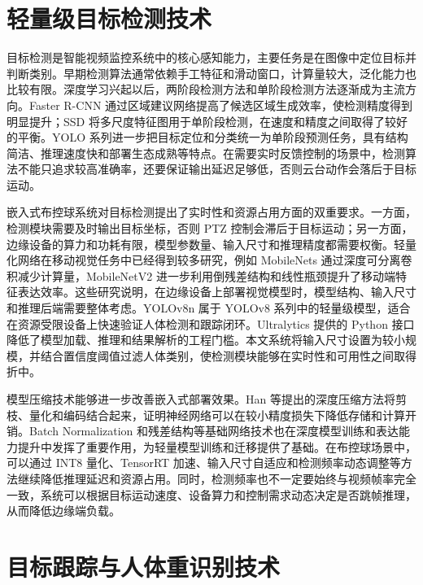 \section{轻量级目标检测技术}

目标检测是智能视频监控系统中的核心感知能力，主要任务是在图像中定位目标并判断类别。早期检测算法通常依赖手工特征和滑动窗口，计算量较大，泛化能力也比较有限。深度学习兴起以后，两阶段检测方法和单阶段检测方法逐渐成为主流方向。Faster R-CNN 通过区域建议网络提高了候选区域生成效率，使检测精度得到明显提升\cite{ren_faster_rcnn_2015}；SSD 将多尺度特征图用于单阶段检测，在速度和精度之间取得了较好的平衡\cite{liu_ssd_2016}。YOLO 系列进一步把目标定位和分类统一为单阶段预测任务，具有结构简洁、推理速度快和部署生态成熟等特点\cite{redmon_yolo_2016,redmon_yolov3_2018}。在需要实时反馈控制的场景中，检测算法不能只追求较高准确率，还要保证输出延迟足够低，否则云台动作会落后于目标运动。

嵌入式布控球系统对目标检测提出了实时性和资源占用方面的双重要求。一方面，检测模块需要及时输出目标坐标，否则 PTZ 控制会滞后于目标运动；另一方面，边缘设备的算力和功耗有限，模型参数量、输入尺寸和推理精度都需要权衡。轻量化网络在移动视觉任务中已经得到较多研究，例如 MobileNets 通过深度可分离卷积减少计算量\cite{howard_mobilenets_2017}，MobileNetV2 进一步利用倒残差结构和线性瓶颈提升了移动端特征表达效率\cite{sandler_mobilenetv2_2018}。这些研究说明，在边缘设备上部署视觉模型时，模型结构、输入尺寸和推理后端需要整体考虑。YOLOv8n 属于 YOLOv8 系列中的轻量级模型，适合在资源受限设备上快速验证人体检测和跟踪闭环。Ultralytics 提供的 Python 接口降低了模型加载、推理和结果解析的工程门槛\cite{ultralytics_yolov8}。本文系统将输入尺寸设置为较小规模，并结合置信度阈值过滤人体类别，使检测模块能够在实时性和可用性之间取得折中。

模型压缩技术能够进一步改善嵌入式部署效果。Han 等提出的深度压缩方法将剪枝、量化和编码结合起来，证明神经网络可以在较小精度损失下降低存储和计算开销\cite{han_deep_compression_2016}。Batch Normalization 和残差结构等基础网络技术也在深度模型训练和表达能力提升中发挥了重要作用\cite{ioffe_batchnorm_2015,he_resnet_2016}，为轻量模型训练和迁移提供了基础。在布控球场景中，可以通过 INT8 量化、TensorRT 加速、输入尺寸自适应和检测频率动态调整等方法继续降低推理延迟和资源占用\cite{nvidia_tensorrt_2024}。同时，检测频率也不一定要始终与视频帧率完全一致，系统可以根据目标运动速度、设备算力和控制需求动态决定是否跳帧推理，从而降低边缘端负载。

\section{目标跟踪与人体重识别技术}

